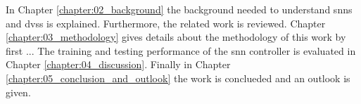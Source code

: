 In Chapter \ref{chapter:02_background} the background needed to understand \acrshort{snn}s and \acrshort{dvs}s is explained.
Furthermore, the related work is reviewed.
Chapter \ref{chapter:03_methodology} gives details about the methodology of this work by first ...
The training and testing performance of the \acrshort{snn} controller is evaluated in Chapter \ref{chapter:04_discussion}.
Finally in Chapter \ref{chapter:05_conclusion_and_outlook} the work is conclueded and an outlook is given.
